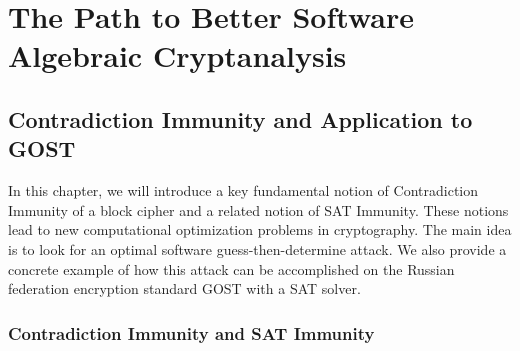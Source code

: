 \part{The Path to Better Software Algebraic Cryptanalysis} \label{Part2}
\chapter{Contradiction Immunity and Application to GOST}\label{ch:GOST}



In this chapter, we will introduce a key fundamental notion of Contradiction Immunity of a block cipher and a related notion of SAT Immunity. These notions lead to new computational optimization problems in cryptography. The main idea is to look for an optimal software guess-then-determine attack. We also provide a concrete example of how this attack can be accomplished on the Russian federation encryption standard GOST with a SAT solver. 

\section{Contradiction Immunity and SAT Immunity}

